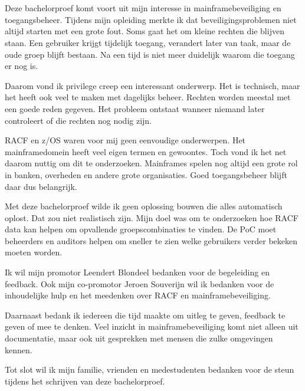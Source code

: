 
\chapter*{}%
\label{ch:voorwoord}

Deze bachelorproef komt voort uit mijn interesse in mainframebeveiliging en toegangsbeheer. Tijdens mijn opleiding merkte ik dat beveiligingsproblemen niet altijd starten met een grote fout. Soms gaat het om kleine rechten die blijven staan. Een gebruiker krijgt tijdelijk toegang, verandert later van taak, maar de oude groep blijft bestaan. Na een tijd is niet meer duidelijk waarom die toegang er nog is.

Daarom vond ik privilege creep een interessant onderwerp. Het is technisch, maar het heeft ook veel te maken met dagelijks beheer. Rechten worden meestal met een goede reden gegeven. Het probleem ontstaat wanneer niemand later controleert of die rechten nog nodig zijn.

RACF en z/OS waren voor mij geen eenvoudige onderwerpen. Het mainframedomein heeft veel eigen termen en gewoontes. Toch vond ik het net daarom nuttig om dit te onderzoeken. Mainframes spelen nog altijd een grote rol in banken, overheden en andere grote organisaties. Goed toegangsbeheer blijft daar dus belangrijk.

Met deze bachelorproef wilde ik geen oplossing bouwen die alles automatisch oplost. Dat zou niet realistisch zijn. Mijn doel was om te onderzoeken hoe RACF data kan helpen om opvallende groepscombinaties te vinden. De PoC moet beheerders en auditors helpen om sneller te zien welke gebruikers verder bekeken moeten worden.

Ik wil mijn promotor Leendert Blondeel bedanken voor de begeleiding en feedback. Ook mijn co-promotor Jeroen Souverijn wil ik bedanken voor de inhoudelijke hulp en het meedenken over RACF en mainframebeveiliging.

Daarnaast bedank ik iedereen die tijd maakte om uitleg te geven, feedback te geven of mee te denken. Veel inzicht in mainframebeveiliging komt niet alleen uit documentatie, maar ook uit gesprekken met mensen die zulke omgevingen kennen.

Tot slot wil ik mijn familie, vrienden en medestudenten bedanken voor de steun tijdens het schrijven van deze bachelorproef.
